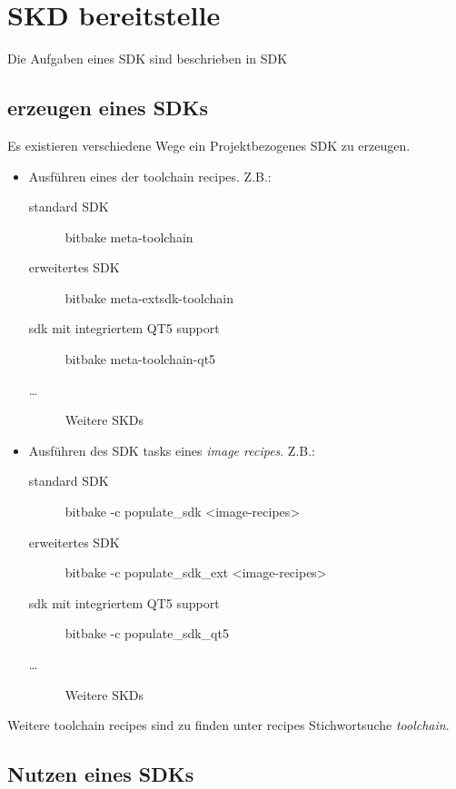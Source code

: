 \chapter{SKD bereitstelle}%
\label{cha:sdk}



Die Aufgaben eines \ac{SDK} sind beschrieben in \gls{SDK}
\label{cha:skd_bereitstelle}


\section{erzeugen eines SDKs}%
\label{sec:erzeugen_eines_sdks}

Es existieren verschiedene Wege ein Projektbezogenes SDK zu erzeugen.


\begin{itemize}
    \item Ausführen eines der toolchain recipes. Z.B.:
        \begin{description}
            \item [standard SDK] bitbake meta-toolchain
            \item [erweitertes SDK] bitbake meta-extsdk-toolchain
            \item [sdk mit integriertem QT5 support] bitbake meta-toolchain-qt5
            \item [\ldots] Weitere SKDs
        \end{description}

    \item Ausführen des SDK tasks eines \textit{image recipes}. Z.B.:
        \begin{description}
            \item [standard SDK] bitbake -c populate\_sdk <image-recipes>
            \item [erweitertes SDK] bitbake -c populate\_sdk\_ext
                <image-recipes>
            \item [sdk mit integriertem QT5 support] bitbake -c
                populate\_sdk\_qt5
            \item [\ldots] Weitere SKDs
        \end{description}
\end{itemize}

Weitere toolchain recipes sind zu finden unter \cite{OEI} recipes
Stich\-wortsuche \textit{toolchain}.


\section{Nutzen eines SDKs}%
\label{sec:nutzen_eines_sdks}

